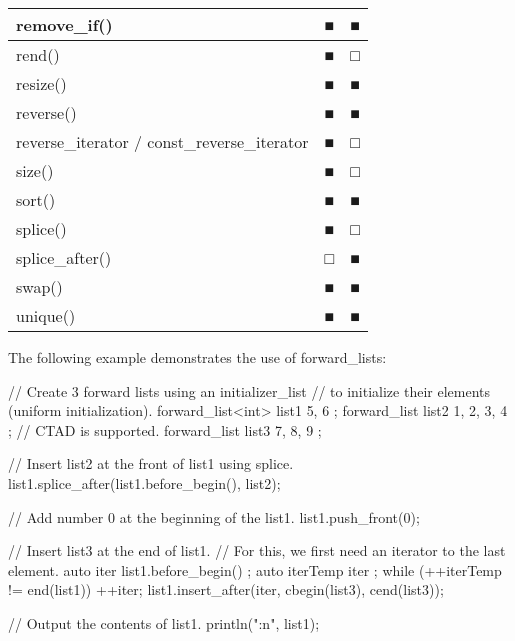 \begin{longtable}{|l|l|l|}
remove\_if()                                 & ■             & ■                      \\ \hline
rend()                                       & ■             & □                      \\ \hline
resize()                                     & ■             & ■                      \\ \hline
reverse()                                    & ■             & ■                      \\ \hline
reverse\_iterator / const\_reverse\_iterator & ■             & □                      \\ \hline
size()                                       & ■             & □                      \\ \hline
sort()                                       & ■             & ■                      \\ \hline
splice()                                     & ■             & □                      \\ \hline
splice\_after()                              & □             & ■                      \\ \hline
swap()                                       & ■             & ■                      \\ \hline
unique()                                     & ■             & ■                      \\ \hline
\end{longtable}

The following example demonstrates the use of forward\_lists:

\begin{cpp}
// Create 3 forward lists using an initializer_list
// to initialize their elements (uniform initialization).
forward_list<int> list1 { 5, 6 };
forward_list list2 { 1, 2, 3, 4 }; // CTAD is supported.
forward_list list3 { 7, 8, 9 };

// Insert list2 at the front of list1 using splice.
list1.splice_after(list1.before_begin(), list2);

// Add number 0 at the beginning of the list1.
list1.push_front(0);

// Insert list3 at the end of list1.
// For this, we first need an iterator to the last element.
auto iter { list1.before_begin() };
auto iterTemp { iter };
while (++iterTemp != end(list1)) { ++iter; }
list1.insert_after(iter, cbegin(list3), cend(list3));

// Output the contents of list1.
println("{:n}", list1);
\end{cpp}

